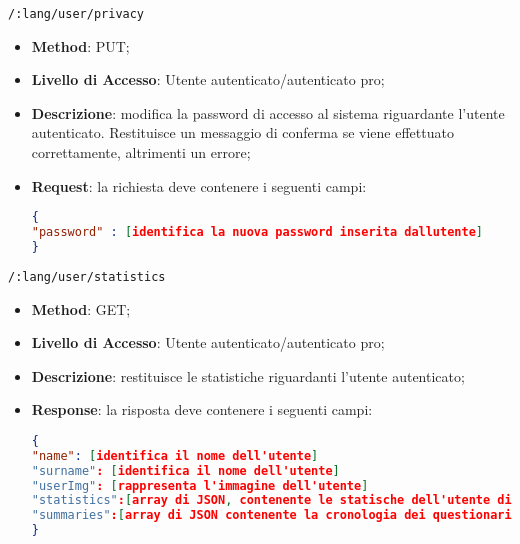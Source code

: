 	\item \texttt{/:lang/user/privacy}
		\begin{itemize}
			\item \textbf{Method}: PUT;
			\item \textbf{Livello di Accesso}: Utente autenticato/autenticato pro;
			\item \textbf{Descrizione}: modifica la password di accesso al sistema riguardante l'utente autenticato. Restituisce un messaggio di conferma se viene effettuato correttamente, altrimenti un errore;
			\item \textbf{Request}: la richiesta deve contenere i seguenti campi:	
\begin{lstlisting}[language=json,firstnumber=1]
{
"password" : [identifica la nuova password inserita dallutente]
}	

\end{lstlisting}
		\end{itemize}
		
	\item \texttt{/:lang/user/statistics}
		\begin{itemize}
			\item \textbf{Method}: GET;
			\item \textbf{Livello di Accesso}: Utente autenticato/autenticato pro;
			\item \textbf{Descrizione}: restituisce le statistiche riguardanti l'utente autenticato; 
			\item \textbf{Response}: la risposta deve contenere i seguenti campi:	
\begin{lstlisting}[language=json,firstnumber=1]
{
"name": [identifica il nome dell'utente]
"surname": [identifica il nome dell'utente]
"userImg": [rappresenta l'immagine dell'utente]
"statistics":[array di JSON, contenente le statische dell'utente di ogni argomento]
"summaries":[array di JSON contenente la cronologia dei questionari svolti dall'utente]   
}	

\end{lstlisting}
		\end{itemize}
	